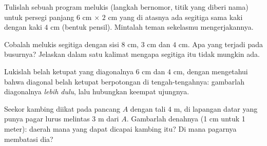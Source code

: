 \begin{exercise}[$\star$]\label{exo:g5:geometry:8}
Tulislah sebuah program melukis (langkah bernomor, titik yang diberi
nama) untuk persegi panjang $6$ cm $\times$ $2$ cm yang di atasnya
ada segitiga sama kaki dengan kaki $4$ cm (bentuk pensil). Mintalah
teman sekelasmu mengerjakannya.
\end{exercise}

\begin{exercise}[$\star\star$]\label{exo:g5:geometry:9}
Cobalah melukis segitiga dengan sisi $8$ cm, $3$ cm dan $4$ cm. Apa
yang terjadi pada busurnya? Jelaskan dalam satu kalimat mengapa
segitiga itu tidak mungkin ada.
\end{exercise}

\begin{exercise}[$\star\star$]\label{exo:g5:geometry:10}
Lukislah belah ketupat yang diagonalnya $6$ cm dan $4$ cm, dengan
mengetahui bahwa diagonal belah ketupat berpotongan  di
tengah-tengahnya: gambarlah diagonalnya \emph{lebih dulu}, lalu
hubungkan keempat ujungnya.
\end{exercise}

\begin{exercise}[$\star\star$]\label{exo:g5:geometry:11}
Seekor kambing diikat pada pancang $A$ dengan tali $4$ m, di
lapangan datar yang punya pagar lurus melintas $3$ m dari $A$.
Gambarlah denahnya (1 cm untuk 1 meter): daerah mana yang dapat
dicapai kambing itu? Di mana pagarnya membatasi dia?

\end{exercise}
